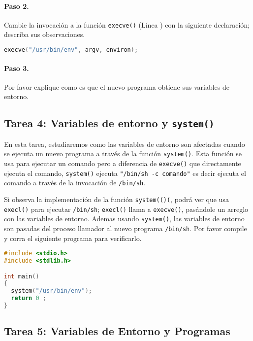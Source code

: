 \paragraph{Paso 2.} Cambie la invocación a la función {\tt execve()} (Línea ) con la siguiente declaración; describa sus observaciones.


\begin{lstlisting}[language=C]
execve("/usr/bin/env", argv, environ);
\end{lstlisting}


\paragraph{Paso 3.} Por favor explique como es que el nuevo programa obtiene sus variables de entorno.



\subsection{Tarea 4: Variables de entorno y {\tt system()}}

En esta tarea, estudiaremos como las variables de entorno son afectadas cuando se ejecuta un nuevo programa a través de la función {\tt system()}. Esta función se usa para ejecutar un comando pero a diferencia de {\tt execve()} que directamente ejecuta el comando, {\tt system()} ejecuta \texttt{"/bin/sh -c comando"} es decir ejecuta el comando a través de la invocación de {\tt /bin/sh}.

Si observa la implementación de la función {\tt system(()(}, podrá ver que usa {\tt execl()} para ejecutar {\tt /bin/sh}; {\tt execl()} llama a {\tt execve()}, pasándole un arreglo con las variables de entorno. 
Ademas usando {\tt system()}, las variables de entorno son pasadas del proceso llamador al nuevo programa {\tt /bin/sh}. Por favor compile y corra el siguiente programa para verificarlo.


\begin{lstlisting}[language=C]
#include <stdio.h>
#include <stdlib.h>

int main()
{
  system("/usr/bin/env");
  return 0 ;
}
\end{lstlisting}



\subsection{Tarea 5: Variables de Entorno y Programas \setuid }

